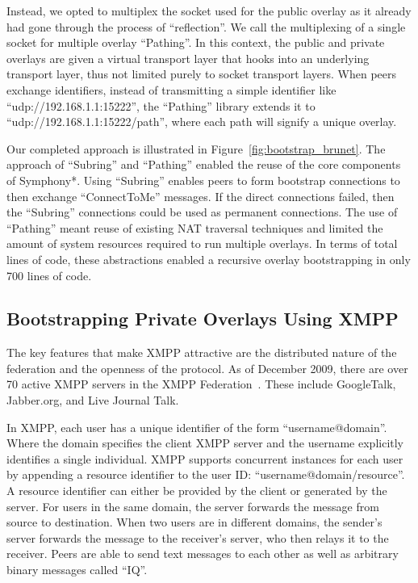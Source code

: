 \documentclass[conference]{IEEEtran}
\begin{document}
Instead, we opted to multiplex the socket used for the public overlay as it
already had gone through the process of ``reflection''.  We call the
multiplexing of a single socket for multiple overlay ``Pathing''.  In this
context, the public and private overlays are given a virtual transport layer
that hooks into an underlying transport layer, thus not limited purely to
socket transport layers.  When peers exchange identifiers, instead of
transmitting a simple identifier like ``udp://192.168.1.1:15222'', the
``Pathing'' library extends it to ``udp://192.168.1.1:15222/path'', where each
path will signify a unique overlay.

Our completed approach is illustrated in Figure~\ref{fig:bootstrap_brunet}.
The approach of ``Subring'' and ``Pathing'' enabled the reuse of the core
components of Symphony*.  Using ``Subring'' enables peers to form bootstrap
connections to then exchange ``ConnectToMe'' messages.  If the direct
connections failed, then the ``Subring'' connections could be used as permanent
connections.  The use of ``Pathing'' meant reuse of existing NAT traversal
techniques and limited the amount of system resources required to run multiple
overlays.  In terms of total lines of code, these abstractions enabled a
recursive overlay bootstrapping in only 700 lines of code.

\subsection{Bootstrapping Private Overlays Using XMPP}
\label{xmpp_bootstrapping}

The key features that make XMPP attractive are the distributed nature of the
federation and the openness of the protocol.  As of December 2009, there are
over 70 active XMPP servers in the XMPP Federation~\cite{xmpp_servers}.  These
include GoogleTalk, Jabber.org, and Live Journal Talk.

In XMPP, each user has a unique identifier of the form ``username@domain''.
Where the domain specifies the client XMPP server and the username explicitly
identifies a single individual.  XMPP supports concurrent instances for each
user by appending a resource identifier to the user ID:
``username@domain/resource''.  A resource identifier can either be provided by
the client or generated by the server.  For users in the same domain, the
server forwards the message from source to destination.  When two users are in
different domains, the sender's server forwards the message to the receiver's
server, who then relays it to the receiver.  Peers are able to send text
messages to each other as well as arbitrary binary messages called ``IQ''.
\end{document}
